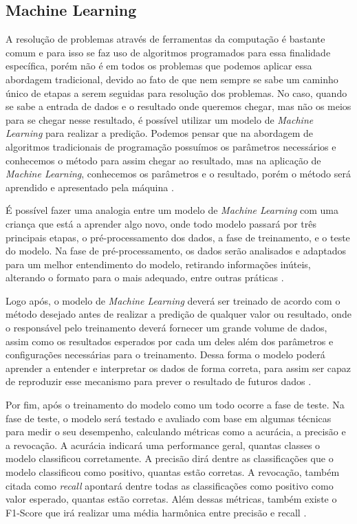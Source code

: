 \subsection{Machine Learning}

A resolução de problemas através de ferramentas da computação é bastante comum e para isso se faz uso de algoritmos programados para essa finalidade específica, porém não é em todos os problemas que podemos aplicar essa abordagem tradicional, devido ao fato de que nem sempre se sabe um caminho único de etapas a serem seguidas para resolução dos problemas. No caso, quando se sabe a entrada de dados e o resultado onde queremos chegar, mas não os meios para se chegar nesse resultado, é possível utilizar um modelo de \emph{Machine Learning} para realizar a predição. Podemos pensar que na abordagem de algoritmos tradicionais de programação possuímos os parâmetros necessários e conhecemos o método para assim chegar ao resultado, mas na aplicação de \emph{Machine Learning}, conhecemos os parâmetros e o resultado, porém o método será aprendido e apresentado pela máquina \cite{machineLearning}.

É possível fazer uma analogia entre um modelo de \emph{Machine Learning} com uma criança que está a aprender algo novo, onde todo modelo passará por três principais etapas, o pré-processamento dos dados, a fase de treinamento, e o teste do modelo. Na fase de pré-processamento, os dados serão analisados e adaptados para um melhor entendimento do modelo, retirando informações inúteis, alterando o formato para o mais adequado, entre outras práticas \cite{machineLearningPython}.

Logo após, o modelo de \emph{Machine Learning} deverá ser treinado de acordo com o método desejado antes de realizar a predição de qualquer valor ou resultado, onde o responsável pelo treinamento deverá fornecer um grande volume de dados, assim como os resultados esperados por cada um deles além dos parâmetros e configurações necessárias para o treinamento. Dessa forma o modelo poderá aprender a entender e interpretar os dados de forma correta, para assim ser capaz de reproduzir esse mecanismo para prever o resultado de futuros dados \cite{machineLearningPython}.

Por fim, após o treinamento do modelo como um todo ocorre a fase de teste. Na fase de teste, o modelo será testado e avaliado com base em algumas técnicas para medir o seu desempenho, calculando métricas como a acurácia, a precisão e a revocação. A acurácia indicará uma performance geral, quantas classes o modelo classificou corretamente. A precisão dirá dentre as classificações que o modelo classificou como positivo, quantas estão corretas. A revocação, também citada como \emph{recall} apontará dentre todas as classificações como positivo como valor esperado, quantas estão corretas. Além dessas métricas, também existe o F1-Score que irá realizar uma média harmônica entre precisão e recall \cite{machineLearningTensorFlow}.

